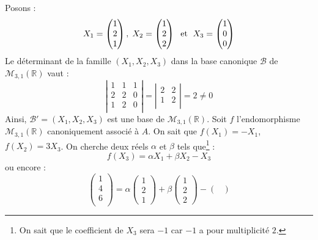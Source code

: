 \documentclass[a4paper,10pt]{report}
\begin{document}
\begin{enumerate}
\noindent Posons :
$$ X_1 = \begin{pmatrix}
1 \\
2 \\
1 \\
\end{pmatrix}, \; X_2 = \begin{pmatrix}
1 \\
2 \\
2 \\
\end{pmatrix} \; \hbox{ et } \; X_3=\begin{pmatrix}
1 \\
0 \\
0 \\
\end{pmatrix}$$
Le déterminant de la famille $(X_1, X_2,X_3)$ dans la base canonique $\mathcal{B}$ de $\mathcal{M}_{3,1}(\mathbb{R})$ vaut :
$$ \left\vert \begin{array}{ccc}
1 & 1 & 1 \\
2 & 2 & 0 \\
1 & 2 & 0 \\
\end{array}\right\vert = \left\vert \begin{array}{cc}
2 & 2 \\
1 & 2  \\
\end{array}\right\vert = 2 \neq 0$$
Ainsi, $\mathcal{B}'=(X_1, X_2, X_3)$ est une base de $\mathcal{M}_{3,1}(\mathbb{R})$. Soit $f$ l'endomorphisme $\mathcal{M}_{3,1}(\mathbb{R})$ canoniquement associé à $A$. On sait que $f(X_1)=-X_1$, $f(X_2)=3X_3$. On cherche deux réels $\alpha$ et $\beta$ tels que\footnote{On sait que le coefficient de $X_3$ sera $-1$ car $-1$ a pour multiplicité $2$.} :
$$ f(X_3) = \alpha X_1 + \beta X_2 - X_3$$
ou encore :
$$ \begin{pmatrix}
1 \\
4 \\
6 \\
\end{pmatrix} = \alpha \begin{pmatrix}
1 \\
2 \\
1
\end{pmatrix} + \beta \begin{pmatrix}
1 \\
2 \\
2
\end{pmatrix} -  \begin{pmatrix}

\end{pmatrix}$$
\end{enumerate}
\end{document}
